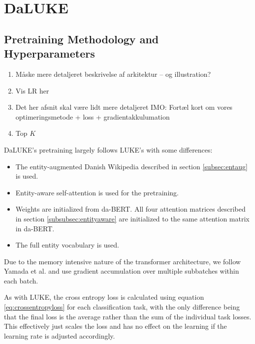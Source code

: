 \documentclass[main.tex]{subfiles}
\begin{document}
\section{DaLUKE}

\subsection{Pretraining Methodology and Hyperparameters}%
\label{sub:dalpre}
\begin{enumerate}
    \item Måske mere detaljeret beskrivelse af arkitektur -- og illustration?
    \item Vis LR her
    \item Det her afsnit skal være lidt mere detaljeret IMO: Fortæl kort om vores optimeringsmetode + loss + gradientakkulumation
    \item Top $K$
\end{enumerate}
DaLUKE's pretraining largely follows LUKE's with some differences:
\begin{itemize}
    \item The entity-augmented Danish Wikipedia described in section \ref{subsec:entaug} is used.
    \item Entity-aware self-attention is used for the pretraining.
    \item Weights are initialized from da-BERT.
    All four attention matrices described in section \ref{subsubsec:entityaware} are initialized to the same attention matrix in da-BERT.
    \item The full entity vocabulary is used.
\end{itemize}
Due to the memory intensive nature of the transformer architecture, we follow Yamada et al. and use gradient accumulation over multiple subbatches within each batch.

As with LUKE, the cross entropy loss is calculated using equation \ref{eq:crossentropyloss} for each classification task, with the only difference being that the final loss is the average rather than the sum of the individual task losses.
This effectively just scales the loss and has no effect on the learning if the learning rate is adjusted accordingly.
\end{document}
